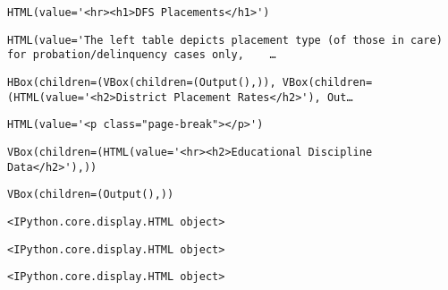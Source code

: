 \documentclass[11pt]{article}
\begin{document}
    
    
    
    
    \begin{verbatim}
HTML(value='<hr><h1>DFS Placements</h1>')
    \end{verbatim}

    
    
    \begin{verbatim}
HTML(value='The left table depicts placement type (of those in care) for probation/delinquency cases only,    …
    \end{verbatim}

    
    
    \begin{verbatim}
HBox(children=(VBox(children=(Output(),)), VBox(children=(HTML(value='<h2>District Placement Rates</h2>'), Out…
    \end{verbatim}

    
    
    \begin{verbatim}
HTML(value='<p class="page-break"></p>')
    \end{verbatim}

    
    
    \begin{verbatim}
VBox(children=(HTML(value='<hr><h2>Educational Discipline Data</h2>'),))
    \end{verbatim}

    
    
    \begin{verbatim}
VBox(children=(Output(),))
    \end{verbatim}

    
    
    \begin{verbatim}
<IPython.core.display.HTML object>
    \end{verbatim}

    
    
    \begin{verbatim}
<IPython.core.display.HTML object>
    \end{verbatim}

    
    
    
    
    \begin{verbatim}
<IPython.core.display.HTML object>
    \end{verbatim}
\end{document}
